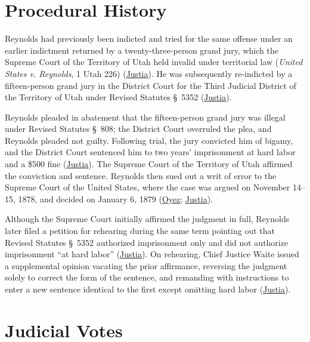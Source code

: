 \documentclass[12pt]{article}
\begin{document}
\section{Procedural History}

Reynolds had previously been indicted and tried for the same offense under an earlier indictment returned by a twenty-three-person grand jury, which the Supreme Court of the Territory of Utah held invalid under territorial law (\textit{United States v. Reynolds}, 1 Utah 226) (\href{https://supreme.justia.com/cases/federal/us/98/145/}{Justia}). He was subsequently re-indicted by a fifteen-person grand jury in the District Court for the Third Judicial District of the Territory of Utah under Revised Statutes \S~5352 (\href{https://supreme.justia.com/cases/federal/us/98/145/}{Justia}).

Reynolds pleaded in abatement that the fifteen-person grand jury was illegal under Revised Statutes \S~808; the District Court overruled the plea, and Reynolds pleaded not guilty. Following trial, the jury convicted him of bigamy, and the District Court sentenced him to two years' imprisonment at hard labor and a \$500 fine (\href{https://supreme.justia.com/cases/federal/us/98/145/}{Justia}). The Supreme Court of the Territory of Utah affirmed the conviction and sentence. Reynolds then sued out a writ of error to the Supreme Court of the United States, where the case was argued on November 14--15, 1878, and decided on January 6, 1879 (\href{https://www.oyez.org/cases/1850-1900/98us145}{Oyez}; \href{https://supreme.justia.com/cases/federal/us/98/145/}{Justia}).

Although the Supreme Court initially affirmed the judgment in full, Reynolds later filed a petition for rehearing during the same term pointing out that Revised Statutes \S~5352 authorized imprisonment only and did not authorize imprisonment ``at hard labor'' (\href{https://supreme.justia.com/cases/federal/us/98/145/}{Justia}). On rehearing, Chief Justice Waite issued a supplemental opinion vacating the prior affirmance, reversing the judgment solely to correct the form of the sentence, and remanding with instructions to enter a new sentence identical to the first except omitting hard labor (\href{https://supreme.justia.com/cases/federal/us/98/145/}{Justia}).

\section{Judicial Votes}
\end{document}
